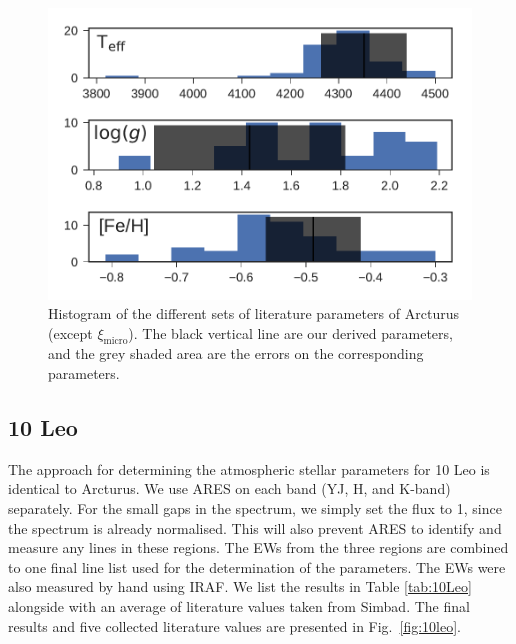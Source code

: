 \documentclass{aa}
\begin{document}
\begin{figure}[htpb!]
    \centering
    \includegraphics[width=1.0\linewidth]{figures/ArcturusParams.pdf}
    \caption{Histogram of the different sets of literature parameters of
             Arcturus (except $\xi_\mathrm{micro}$). The black vertical line are
             our derived parameters, and the grey shaded area are the errors on
             the corresponding parameters.}
    \label{fig:arcturus}
\end{figure}



\subsection{10 Leo}
\label{sec:10Leo}

The approach for determining the atmospheric stellar parameters for 10 Leo is
identical to Arcturus. We use ARES on each band (YJ, H, and K-band) separately.
For the small gaps in the spectrum, we simply set the flux to 1, since the
spectrum is already normalised. This will also prevent ARES to identify and
measure any lines in these regions. The EWs from the three regions are combined
to one final line list used for the determination of the parameters. The EWs
were also measured by hand using IRAF. We list the results in
Table \ref{tab:10Leo} alongside with an average of literature values taken from
Simbad. The final results and five collected literature values are presented in
Fig.~\ref{fig:10leo}.
\end{document}
